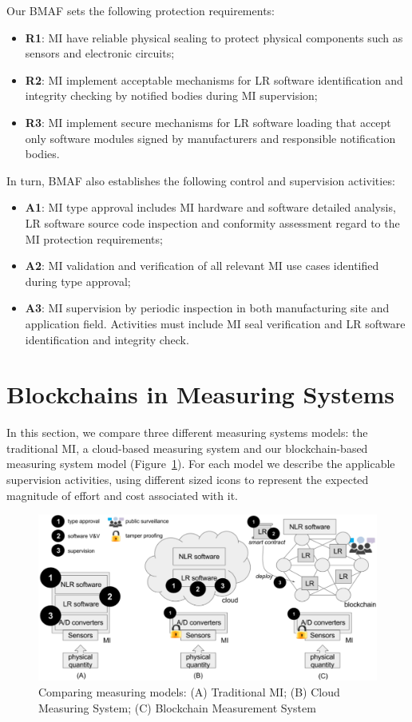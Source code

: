 \documentclass[journal]{IEEEtran}
\begin{document}
Our BMAF sets the following protection requirements:
\begin{itemize}
 \item \textbf{R1}: MI have reliable physical sealing to protect physical components such as sensors and electronic circuits;
 \item \textbf{R2}: MI implement acceptable mechanisms for LR software identification and integrity checking by notified bodies during MI supervision;
 \item \textbf{R3}: MI implement secure mechanisms for LR software loading that accept only software modules signed by manufacturers and responsible notification bodies.
\end{itemize}

In turn, BMAF also establishes the following control and supervision activities:
\begin{itemize}
 \item \textbf{A1}: MI type approval includes MI hardware and software detailed analysis, LR software source code inspection and conformity assessment regard to the MI protection requirements;
 \item \textbf{A2}: MI validation and verification of all relevant MI use cases identified during type approval;
 \item \textbf{A3}: MI supervision by periodic inspection in both manufacturing site and application field. Activities must include MI seal verification and LR software identification and integrity check.
\end{itemize}

\section{Blockchains in Measuring Systems}
In this section, we compare three different measuring systems models: the traditional MI, a cloud-based measuring system and our blockchain-based measuring system model (Figure~\ref{f:compare}). For each model we describe the applicable supervision activities, using different sized icons to represent the expected magnitude of effort and cost associated with it.

\begin{figure}[!t]
\centering
\includegraphics[width=.69\textwidth]{measuring} %
\caption{Comparing measuring models: (A) Traditional MI; (B) Cloud Measuring System; (C) Blockchain Measurement System}
\label{f:compare}
\end{figure}
\end{document}
